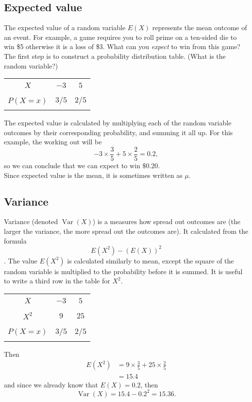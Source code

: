 \documentclass[12pt]{book}
\DeclareMathOperator{\var}{Var}
\theoremstyle{definition}
\begin{document}
\subsection{Expected value}
  The expected value of a random variable $E(X)$ represents the mean outcome of an event. For example, a game requires you to roll prime on
  a ten-sided die to win \$5 otherwise it is a loss of \$3. What can you \textit{expect} to win from this game? The first step
  is to construct a probability distribution table. (What is the random variable?)
  \begin{center}\begin{tabular}{|c|c|c|}
  \hline &&\\[-0.6em]
  $X$ & $-3$ & $5$ \\[-0.6em] && \\
  \hline
  &&\\[-0.6em]
  $P(X=x)$ & $3/5$ & $2/5$ \\[-0.6em] && \\
  \hline
  \end{tabular}\end{center}
  The expected value is calculated by multiplying each of the random variable outcomes by their corresponding probability, and
  summing it all up. For this example, the working out will be
  \[-3\times\frac{3}{5}+5\times\frac{2}{5}=0.2,\] so we can conclude that we can expect to win $\$0.20$.
  \vspace{1em}\\
  Since expected value is the mean, it is sometimes written as $\mu$.
\subsection{Variance}
  Variance (denoted $\var(X)$) is a measures how spread out outcomes are (the larger the variance, the more spread out the outcomes are). It calculated 
  from the formula \[E(X^2)-\left(E(X)\right)^2\]. The value $E(X^2)$ is calculated similarly to mean, except the square of the random
  variable is multiplied to the probability before it is summed. It is useful to write a third row in the table for $X^2$.
  \begin{center}\begin{tabular}{|c|c|c|}
  \hline &&\\[-0.6em]
  $X$ & $-3$ & $5$ \\[-0.6em] && \\
  \hline
  &&\\[-0.6em]
  $X^2$ & $9$ & $25$ \\[-0.6em] && \\
  \hline && \\[-0.6em]
  $P(X=x)$ & $3/5$ & $2/5$ \\[-0.6em] && \\
  \hline
  \end{tabular}\end{center}
  Then \[\begin{aligned}E(X^2) &=9\times\frac{3}{5}+25\times\frac{2}{5}\\ &= 15.4\end{aligned}\] and since we already know
  that $E(X)=0.2$, then 
  \[\var(X)=15.4-0.2^2=15.36.\]
\end{document}
